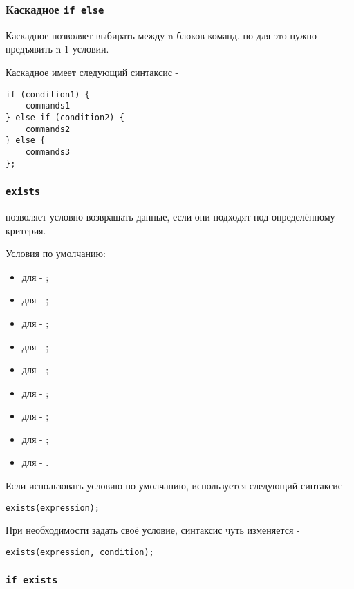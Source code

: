 \documentclass[a4paper, 14pt]{extarticle}
\newenvironment{icItems}
	{ \begin{itemize} [noitemsep,nolistsep] }
	{ \end{itemize} }
\begin{document}
\subsubsection{Каскадное \lstinline`if else`}

Каскадное  позволяет выбирать между n блоков команд, но для это нужно предъявить n-1 условии.

Каскадное  имеет следующий синтаксис -
\begin{lstlisting}[numbers=none]
if (condition1) {
	commands1
} else if (condition2) {
	commands2
} else {
	commands3
};
\end{lstlisting}

\subsubsection{\lstinline`exists`}

 позволяет условно возвращать данные, если они подходят под определённому критерия.

Условия по умолчанию:
\begin{icItems}
\item
	для \bool{} - ;
\item
	для \integer{} - ;
\item
	для \double{} - ;
\item
	для \str{} - ;
\item
	для \listtype{} - ;
\item
	для \object{} - ;
\item
	для \set{} - ;
\item
	для \request{} - ;
\item
	для \element{} - .
\end{icItems}

Если использовать условию по умолчанию, используется следующий синтаксис -
\begin{lstlisting}[numbers=none]
exists(expression);
\end{lstlisting}
При необходимости задать своё условие, синтаксис чуть изменяется -
\begin{lstlisting}[numbers=none]
exists(expression, condition);
\end{lstlisting}

\subsubsection{\lstinline`if exists`}
\end{document}
